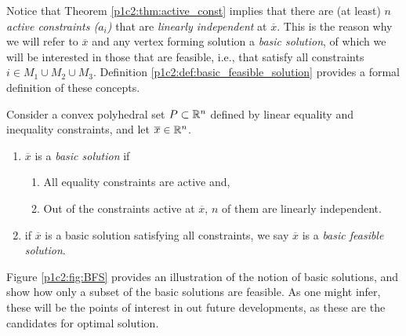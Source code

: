Notice that Theorem \ref{p1c2:thm:active_const} implies that there are (at least) \emph{$n$ active constraints ($a_i$)} that are \emph{linearly independent} at $\overline{x}$. This is the reason why we will refer to $\overline{x}$ and any vertex forming solution a \emph{basic solution}, of which we will be interested in those that are feasible, i.e., that satisfy all constraints $i \in M_1 \cup M_2 \cup M_3$. Definition \ref{p1c2:def:basic_feasible_solution} provides a formal definition of these concepts.

\begin{definition} \label{p1c2:def:basic_feasible_solution}
	Consider a convex polyhedral set $P \subset \mathbb{R}^n$ defined by linear equality and inequality constraints, and let $\overline{x} \in \mathbb{R}^n$.
	\begin{enumerate}
		\item $\overline{x}$ is a \emph{basic solution} if 
		\begin{enumerate}
			\item All equality constraints are active and,
			\item Out of the constraints active at $\overline{x}$, $n$ of them are linearly independent.
		\end{enumerate}
		\item if $\overline{x}$  is a basic solution satisfying all constraints, we say $\overline{x}$ is a \emph{basic feasible solution}. 
	\end{enumerate}
\end{definition}

Figure \ref{p1c2:fig:BFS} provides an illustration of the notion of basic solutions, and show how only a subset of the basic solutions are feasible. As one might infer, these will be the points of interest in out future developments, as these are the candidates for optimal solution.


